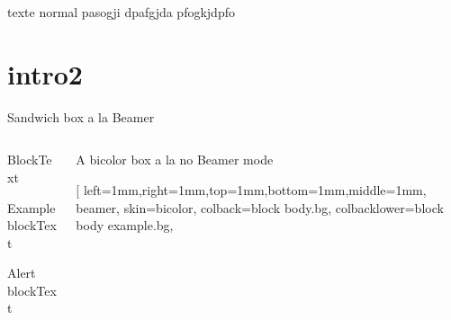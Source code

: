 \documentclass[11pt, xcolor=svgnames]{beamer}
\begin{document}
\begin{darkframes}
\begin{frame}
\begin{columns}
\begin{column}{.5\textwidth}
\end{column}
\end{columns}
texte normal pasogji dpafgjda pfogkjdpfo
\end{frame}


\section{intro2}

\begin{frame}{Sandwich box a la Beamer}
\begin{columns}[c]
\begin{column}{.3\linewidth} %
\begin{block}{Block}Text\end{block} %
\begin{exampleblock}{Example  block}Text\end{exampleblock} %
\begin{alertblock}{Alert block}Text\end{alertblock} %
\end{column}
\begin{column}{.4\linewidth}
\begin{tcolorbox}[
left=1mm,right=1mm,top=1mm,bottom=1mm,middle=1mm,
skin=bicolor,
arc=5pt, %
bottomrule=0pt,
leftrule=00pt, %
rightrule=0pt,
toprule=0pt,
colback=block body alerted.bg, %
colbacklower=block body example.bg, %
collower=block title.bg,
colframe=block title.bg!1!black, %
frame style={left color=block title.bg,
right color=block title example.bg!100!black}, %
fuzzy shadow={1mm}{-1mm}{-.25mm}{.5pt}{structure!20!black}%
,title=Testing Sans utiliser -beamer ]
A bicolor box
\tcblower
a la \dotfill \alert{no} Beamer mode 
\end{tcolorbox}
\bigskip
\begin{tcolorbox}[
left=1mm,right=1mm,top=1mm,bottom=1mm,middle=1mm, %
beamer, %
skin=bicolor,
colback=block body.bg, %
colbacklower=block body example.bg, %

\end{tcolorbox}
\end{column}
\end{columns}
\end{frame}
\end{darkframes}
\end{document}
